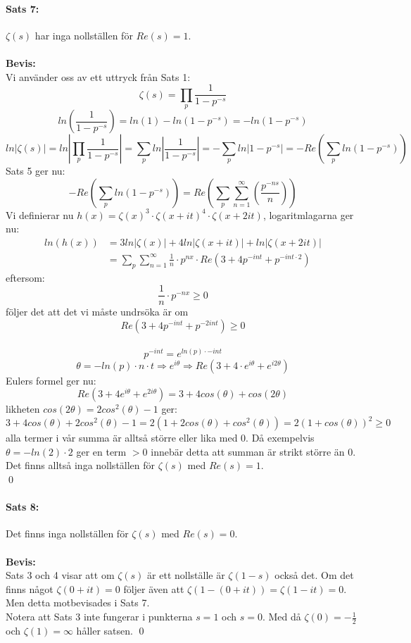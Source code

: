 \documentclass{article}%
\begin{document}
\newcommand*{\ps}{1 - p^{-s}}
\paragraph{Sats 7:} $\zeta(s)$ har inga nollställen för $Re(s) = 1$. \\
\\
{\bf Bevis:}\\
Vi använder oss av ett uttryck från Sats 1:
$$\zeta(s) = \prod_p \frac 1 {1 - p^{-s}}$$
$$ln(\frac 1 {1 - p^{-s}}) = ln(1) - ln(1 - p^{-s}) = -ln(1 - p^{-s})$$
\[ ln \left | \zeta(s) \right| = ln \left |\prod_p \frac 1 {1 - p^{-s}} \right |
	= \sum_p ln \left | \frac 1 {1 - p^{-s}} \right | = - \sum_p ln \left |1 - p^{-s} \right | = - Re(\sum_p ln(\ps))\] 
Sats 5 ger nu:
$$-Re(\sum_p ln(\ps)) = Re(\sum_p \sum_{n = 1}^\infty(\frac {p^{-ns}} n))$$
Vi definierar nu $h(x) = \zeta(x)^3 \cdot \zeta(x + it)^4 \cdot \zeta(x + 2it)$, logaritmlagarna ger nu:
\begin{align*}
	ln(h(x)) &= 3 ln \left | \zeta(x) \right | + 4 ln \left | \zeta(x + it) \right | + ln \left | \zeta(x + 2it) \right |\\  
			 &= \sum_p \sum_{n = 1}^\infty \frac 1 n \cdot p^{nx} \cdot Re(3 + 4p^{-int} + p^{-int \cdot 2}) 
\end{align*}
eftersom:
$$\frac 1 n \cdot p^{-nx} \ge 0$$
följer det att det vi måste undrsöka är om \\
$$Re(3 + 4p^{-int} + p^{-2int}) \ge 0$$
\\
$$p^{-int} = e^{ln(p) \cdot -int}$$
$$\theta = -ln(p) \cdot n \cdot t \Rightarrow e^{i\theta} \Rightarrow Re(3 + 4 \cdot e^{i\theta} + e^{i2\theta})$$
Eulers formel ger nu:
$$Re(3 + 4e^{i\theta} + e^{2i\theta}) = 3 + 4cos(\theta) + cos(2\theta)$$
likheten $cos(2\theta) = 2cos^2(\theta) - 1$ ger:
$$3 + 4 cos(\theta) + 2 cos^2(\theta) - 1 = 2(1 + 2cos(\theta) + cos^2(\theta)) = 2(1 + cos(\theta))^2 \ge 0$$
alla termer i vår summa är alltså större eller lika med 0. Då exempelvis\\
$\theta = -ln(2) \cdot 2$ ger en term $ > 0$ innebär detta att summan är strikt större än 0.\\
Det finns alltså inga nollställen för $\zeta(s)$ med $Re(s) = 1$.\\
\hfill \qed

\paragraph{Sats 8:} Det finns inga nollställen för $\zeta(s)$ med $Re(s) = 0.$\\
\\
{\bf Bevis:}\\
Sats 3 och 4 visar att om $\zeta(s)$ är ett nollställe är $\zeta(1 - s)$ också det.
Om det finns något $\zeta(0 + it) = 0$ följer även att $\zeta(1 - (0 + it)) = \zeta(1 - it) = 0$. Men detta 
motbevisades i Sats 7.\\
Notera att Sats 3 inte fungerar i punkterna $s = 1$ och $s = 0$. Med då $\zeta(0) = -\frac 1 2$ och 
$\zeta(1) = \infty$ håller satsen.
\hfill \qed
\pagebreak
\end{document}
